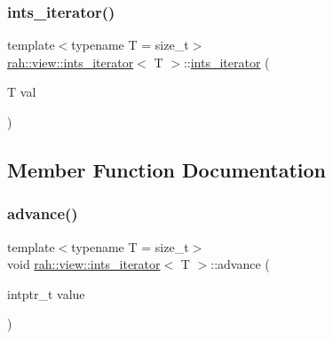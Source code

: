 \subsubsection{\texorpdfstring{ints\_iterator()}{ints\_iterator()}\hspace{0.1cm}{\footnotesize\ttfamily [4/4]}}
{\footnotesize\ttfamily template$<$typename T  = size\+\_\+t$>$ \\
\mbox{\hyperlink{structrah_1_1view_1_1ints__iterator}{rah\+::view\+::ints\+\_\+iterator}}$<$ T $>$\+::\mbox{\hyperlink{structrah_1_1view_1_1ints__iterator}{ints\+\_\+iterator}} (\begin{DoxyParamCaption}\item[{T}]{val }\end{DoxyParamCaption})\hspace{0.3cm}{\ttfamily [inline]}}



\subsection{Member Function Documentation}
\mbox{\label{structrah_1_1view_1_1ints__iterator_a0f8e2c678b31a59deaa522f967c86518}} 
\subsubsection{\texorpdfstring{advance()}{advance()}\hspace{0.1cm}{\footnotesize\ttfamily [1/2]}}
{\footnotesize\ttfamily template$<$typename T  = size\+\_\+t$>$ \\
void \mbox{\hyperlink{structrah_1_1view_1_1ints__iterator}{rah\+::view\+::ints\+\_\+iterator}}$<$ T $>$\+::advance (\begin{DoxyParamCaption}\item[{intptr\+\_\+t}]{value }\end{DoxyParamCaption})\hspace{0.3cm}{\ttfamily [inline]}}

\mbox{\label{structrah_1_1view_1_1ints__iterator_a0f8e2c678b31a59deaa522f967c86518}} 
